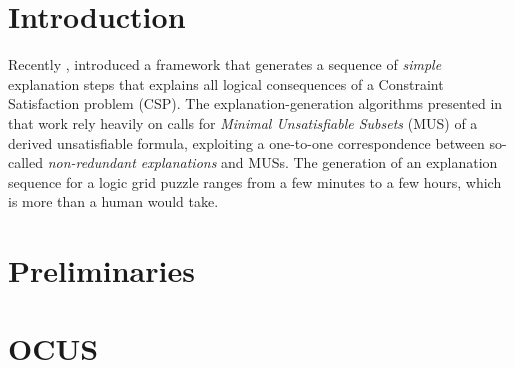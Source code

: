 \documentclass[runningheads]{llncs}
\begin{document}
\begin{abstract}
\end{abstract}
%
%
%
\section{Introduction}
	Recently \cite{bogaerts2020framework}, introduced a framework that generates a sequence of \emph{simple} explanation steps that explains all logical consequences of a Constraint Satisfaction problem (CSP). 
The explanation-generation algorithms presented in that work rely heavily on calls for \emph{Minimal Unsatisfiable Subsets} (MUS) \cite{marques2010minimal} of a derived unsatisfiable formula, exploiting a one-to-one correspondence between so-called \emph{non-redundant explanations} and MUSs. 
The generation of an explanation sequence for a logic grid puzzle ranges from a few minutes to a few hours, which is more than a human would take.
\section{Preliminaries}

\section{OCUS}
\end{document}
